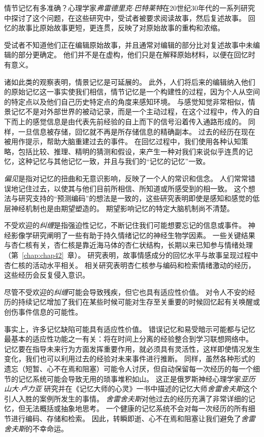 \begin{proposition}[情节记忆在回忆过程中会发生变化] \label{box:52_1}
	
	\quad \quad 情节记忆有多准确？心理学家\textit{弗雷德里克$\cdot$巴特莱特}在20世纪30年代的一系列研究中探讨了这个问题，在这些研究中，受试者被要求阅读故事，然后复述故事。
	回忆的故事比原始故事更短，更连贯，反映了对原始故事的重构和浓缩。
	
	\quad \quad 受试者不知道他们正在编辑原始故事，并且通常对编辑的部分比对复述故事中未编辑的部分更确定。
	他们并不是在虚构，他们只是在解释原始材料，以便在回忆时有意义。
	
	\quad \quad 诸如此类的观察表明，情景记忆是可延展的。
	此外，人们将后来的编辑纳入他们的原始记忆这一事实使我们相信，情节记忆是一个构建性的过程，因为个人从空间的特定点以及他们自己历史特定点的角度来感知环境。
	与感觉知觉非常相似，情景记忆不是对外部世界的被动记录，而是一个主动过程，在这个过程中，传入的自下而上的感觉信息是由代表先前经验的自上而下的信号沿着传入通路形成的。
	同样，一旦信息被存储，回忆就不再是所存储信息的精确副本。
	过去的经历在现在被用作提示，帮助大脑重建过去的事件。
	在回忆过程中，我们使用各种认知策略，包括比较、推理、精明的猜测和假设，来产生一种对我们来说似乎连贯的记忆，这种记忆与其他记忆一致，并且与我们的“记忆的记忆”一致。
	
\end{proposition}


\textit{偏见}是指对记忆的扭曲和无意识影响，反映了一个人的常识和信念。
人们常常错误地记住过去，以使其与他们目前所相信、所知道或所感受到的相一致。
这个想法与研究支持的“预测编码”的想法是一致的，这些研究表明即使是感知和感觉的低层神经机制也是由期望塑造的。
期望影响记忆的特定大脑机制尚不清楚。


不受欢迎的\textit{纠缠}是指强迫性记忆，不断记住我们可能想要忘记的信息或事件。
神经影像学研究阐明了一些有助于持久情绪记忆的神经生物学因素。
一些关键结果与杏仁核有关，杏仁核是靠近海马体的杏仁状结构，长期以来已知参与情绪处理（第~\ref{chap:chap42}~章）。
研究表明，故事情感成分的回忆水平与故事呈现过程中杏仁核的活动水平相关。
相关研究表明杏仁核参与编码和检索情绪激动的经历，这些经历会反复侵入意识。


尽管不受欢迎的\textit{纠缠}可能会导致残疾，但它也具有适应性价值。
对令人不安的经历的持续记忆增加了我们在某些时候可能对生存至关重要的时候回忆起有关唤醒或创伤事件信息的可能性。


事实上，许多记忆缺陷可能具有适应性价值。
错误记忆和易受暗示可能都与记忆最基本的适应性功能之一有关：将在时间上分离的经验整合到学习联想网络中。
记忆要在指导未来行为方面发挥重要作用，就必须具有灵活性，这样即使情况发生变化，我们也可以利用过去的经验对未来事件进行推断。
同样，虽然各种形式的遗忘（短暂、心不在焉和阻塞）可能令人讨厌，但自动保留每一次经历的每一个细节的记忆系统可能会导致无用的琐事堆积如山。
这正是俄罗斯神经心理学家\textit{亚历山大$\cdot$卢力亚} 研究并在《记忆大师的心灵》一书中描述的记忆大师\textit{舍雷舍夫斯}这个引人入胜的案例所发生的事情。
\textit{舍雷舍夫斯}对他过去的经历充满了非常详细的记忆，但无法概括或抽象地思考。
一个健康的记忆系统不会对每一次经历的所有细节进行编码、存储和检索。
因此，转瞬即逝、心不在焉和阻塞让我们避免了\textit{舍雷舍夫斯}的不幸命运。



